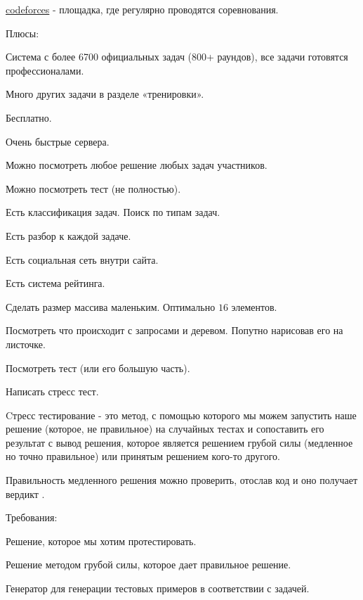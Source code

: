 
\href{https://codeforces.com}{codeforces} - площадка, где регулярно проводятся соревнования.

Плюсы:
\up \up
\begin{MyList}[0pt]
	\item Система с более 6700 официальных задач (800+ раундов), все задачи готовятся профессионалами.
	\item Много других задачи в разделе «тренировки».
	\item Бесплатно.
	\item Очень быстрые сервера.
	\item Можно посмотреть любое решение любых задач участников.
	\item Можно посмотреть тест (не полностью).
	\item Есть классификация задач. Поиск по типам задач. 
	\item Есть разбор к каждой задаче.
	\item Есть социальная сеть внутри сайта.
	\item Есть система рейтинга.
\end{MyList} \up \up


\up \up
\begin{MyList}[0pt]
	\item Сделать размер массива маленьким. Оптимально $16$ элементов.
	\item Посмотреть что происходит с запросами и деревом. Попутно нарисовав его на листочке.
	\item Посмотреть тест (или его большую часть).
	\item Написать стресс тест.
\end{MyList} \up \up


Cтресс тестирование - это метод, с помощью которого мы можем запустить наше решение (которое, не правильное) на случайных тестах и сопоставить его результат с вывод решения, которое является решением грубой силы (медленное но точно правильное) или принятым решением кого-то другого.

Правильность медленного решения можно проверить, отослав код и оно получает вердикт .

Требования:
\up \up
\begin{MyList}[0pt]
	\item Решение, которое мы хотим протестировать.
	\item Решение методом грубой силы, которое дает правильное решение.
	\item Генератор для генерации тестовых примеров в соответствии с задачей.
\end{MyList} \up \up


